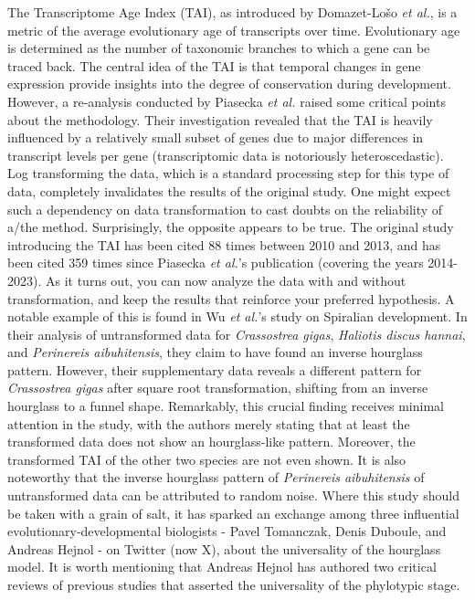 The Transcriptome Age Index (TAI), as introduced by Domazet-Lošo \textit{et al.}, is a metric of the average evolutionary age of transcripts over time\cite{DomazetLoso2010}. Evolutionary age is determined as the number of taxonomic branches to which a gene can be traced back. The central idea of the TAI is that temporal changes in gene expression provide insights into the degree of conservation during development. However, a re-analysis conducted by Piasecka \textit{et al.} raised some critical points about the methodology\cite{Piasecka2013}. Their investigation revealed that the TAI is heavily influenced by a relatively small subset of genes due to major differences in transcript levels per gene (transcriptomic data is notoriously heteroscedastic). Log transforming the data, which is a standard processing step for this type of data, completely invalidates the results of the original study. One might expect such a dependency on data transformation to cast doubts on the reliability of a/the method. Surprisingly, the opposite appears to be true. The original study introducing the TAI has been cited 88 times between 2010 and 2013, and has been cited 359 times since Piasecka \textit{et al.}'s publication (covering the years 2014-2023). As it turns out, you can now analyze the data with and without transformation, and keep the results that reinforce your preferred hypothesis. A notable example of this is found in Wu \textit{et al.}'s study on Spiralian development\cite{Wu2019}. In their analysis of untransformed data for \textit{Crassostrea gigas}, \textit{Haliotis discus hannai}, and \textit{Perinereis aibuhitensis}, they claim to have found an inverse hourglass pattern. However, their supplementary data reveals a different pattern for \textit{Crassostrea gigas} after square root transformation, shifting from an inverse hourglass to a funnel shape. Remarkably, this crucial finding receives minimal attention in the study, with the authors merely stating that at least the transformed data does not show an hourglass-like pattern. Moreover, the transformed TAI of the other two species are not even shown. It is also noteworthy that the inverse hourglass pattern of \textit{Perinereis aibuhitensis} of untransformed data can be attributed to random noise. Where this study should be taken with a grain of salt, it has sparked an exchange among three influential evolutionary-developmental biologists - Pavel Tomanczak, Denis Duboule, and Andreas Hejnol - on Twitter (now X), about the universality of the hourglass model\cite{hejnoltwitter}. It is worth mentioning that Andreas Hejnol has authored two critical reviews of previous studies that asserted the universality of the phylotypic stage\cite{Dunn2018,hejnol2016}.

